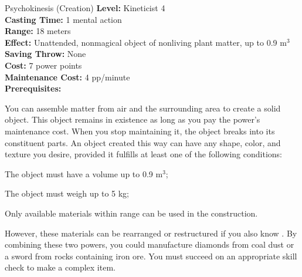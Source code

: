 {Psychokinesis (Creation)}
{
	\textbf{Level:}
	Kineticist 4\\
	\textbf{Casting Time:}
	1 mental action\\
	\textbf{Range:}
	18 meters\\
	\textbf{Effect:}
	Unattended, nonmagical object of nonliving plant matter, up to 0.9 m$^3$\\
	\textbf{Saving Throw:}
	None\\
	\textbf{Cost:}
	7 power points\\
	\textbf{Maintenance Cost:}
	4 pp/minute\\
	\textbf{Prerequisites:}
	\\
}
{
	You can assemble matter from air and the surrounding area to create a solid object. This object remains in existence as long as you pay the power's maintenance cost. When you stop maintaining it, the object breaks into its constituent parts. An object created this way can have any shape, color, and texture you desire, provided it fulfills at least one of the following conditions:
	\begin{enumerate*}
	\item The object must have a volume up to 0.9 m$^3$;
	\item The object must weigh up to 5 kg;
	\item Only available materials within range can be used in the construction.
	\end{enumerate*}

	However, these materials can be rearranged or restructured if you also know . By combining these two powers, you could manufacture diamonds from coal dust or a sword from rocks containing iron ore. You must succeed on an appropriate skill check to make a complex item. 
}